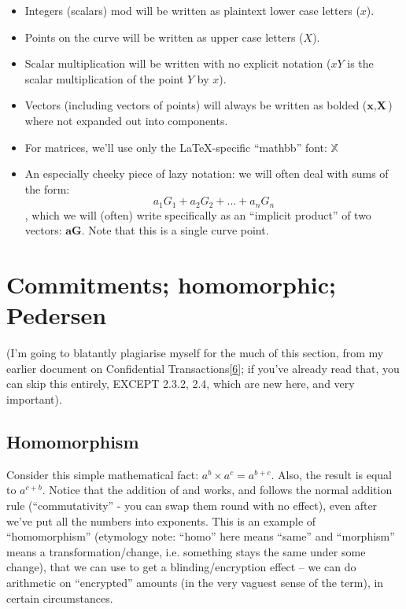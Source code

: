 \documentclass[10pt,a4paper]{article}
\providecommand{\tightlist}{%
  \setlength{\itemsep}{0pt}\setlength{\parskip}{0pt}}
\begin{document}
\begin{itemize}
\tightlist
\item
  Integers (scalars) mod will be written as plaintext lower case letters
  ($x$).
\item
  Points on the curve will be written as upper case letters ($X$).
\item
  Scalar multiplication will be written with no explicit notation ($xY$ is
  the scalar multiplication of the point $Y$ by $x$).
\item
  Vectors (including vectors of points) will always be written as bolded ($\textbf{x}, \textbf{X}$)
  where not expanded out into components.
\item
  For matrices, we'll use only the LaTeX-specific ``mathbb'' font: $\mathbb{X}$
\item
  An especially cheeky piece of lazy notation: we will often deal with
  sums of the form:
  \[a_1G_1 + a_2G_2 + \ldots + a_nG_n \]
, which we will (often) write specifically as an ``implicit product'' of
two vectors: $\textbf{aG}$. Note that this is a single curve point.
\end{itemize}
\hypertarget{commitments-homomorphic-pedersen}{%
\section[Commitments; homomorphic;
Pedersen]{\texorpdfstring{\protect\hypertarget{anchor-12}{}{}Commitments;
homomorphic;
Pedersen}{Commitments; homomorphic; Pedersen}}\label{commitments-homomorphic-pedersen}}

(I'm going to blatantly plagiarise myself for the much of this section,
from my earlier document on Confidential
Transactions{[}\protect\hyperlink{anchor-3}{6}{]}; if you've already
read that, you can skip this entirely, EXCEPT 2.3.2, 2.4, which are new
here, and very important).

\hypertarget{homomorphism}{%
\subsection[Homomorphism]{\texorpdfstring{\protect\hypertarget{anchor-13}{}{}Homomorphism}{Homomorphism}}\label{homomorphism}}

Consider this simple mathematical fact: $a^b \times a^c = a^{b+c}$. Also, the result is equal to $a^{c+b}$.
Notice that the addition of and works, and follows the normal addition
rule (``commutativity'' - you can swap them round with no effect), even
after we've put all the numbers into exponents. This is an example of
``homomorphism'' (etymology note: ``homo'' here means ``same'' and
``morphism'' means a transformation/change, i.e. something stays the
same under some change), that we can use to get a blinding/encryption
effect -- we can do arithmetic on ``encrypted'' amounts (in the very
vaguest sense of the term), in certain circumstances.
\end{document}
